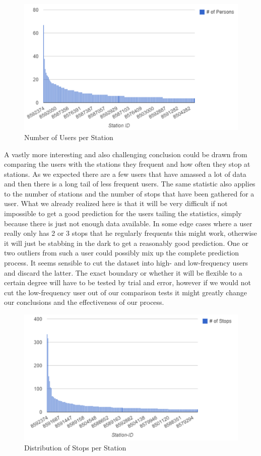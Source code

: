 \begin{figure}[!ht]
	\caption{Number of Users per Station}
	\centering
	\includegraphics[width=1.0\textwidth]{charts/persons_per_station}
\end{figure}

A vastly more interesting and also challenging conclusion could be drawn from comparing the users with the stations they frequent and how often they stop at stations. As we expected there are a few users that have amassed a lot of data and then there is a long tail of less frequent users. The same statistic also applies to the number of stations and the number of stops that have been gathered for a user. What we already realized here is that it will be very difficult if not impossible to get a good prediction for the users tailing the statistics, simply because there is just not enough data available. In some edge cases where a user really only has 2 or 3 stops that he regularly frequents this might work, otherwise it will just be stabbing in the dark to get a reasonably good prediction. One or two outliers from such a user could possibly mix up the complete prediction process. It seems sensible to cut the dataset into high- and low-frequency users and discard the latter. The exact boundary or whether it will be flexible to a certain degree will have to be tested by trial and error, however if we would not cut the low-frequency user out of our comparison tests it might greatly change our conclusions and the effectiveness of our process.

\begin{figure}[!ht]
	\caption{Distribution of Stops per Station}
	\centering
	\includegraphics[width=1.0\textwidth]{charts/distribution_stops_by_station}
\end{figure}

